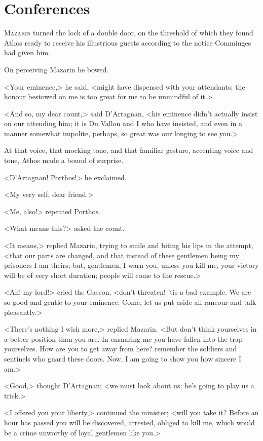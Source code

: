 \chapter{Conferences}

 \lettrine{M}{azarin} turned the lock of a double door, on the threshold of which they found Athos ready to receive his illustrious guests according to the notice Comminges had given him.

\zz
On perceiving Mazarin he bowed.

<Your eminence,> he said, <might have dispensed with your attendants; the honour bestowed on me is too great for me to be unmindful of it.>

<And so, my dear count,> said D'Artagnan, <his eminence didn't actually insist on our attending him; it is Du Vallon and I who have insisted, and even in a manner somewhat impolite, perhaps, so great was our longing to see you.>

At that voice, that mocking tone, and that familiar gesture, accenting voice and tone, Athos made a bound of surprise.

<D'Artagnan! Porthos!> he exclaimed.

<My very self, dear friend.>

<Me, also!> repeated Porthos.

<What means this?> asked the count.

<It means,> replied Mazarin, trying to smile and biting his lips in the attempt, <that our parts are changed, and that instead of these gentlemen being my prisoners I am theirs; but, gentlemen, I warn you, unless you kill me, your victory will be of very short duration; people will come to the rescue.>

<Ah! my lord!> cried the Gascon, <don't threaten! 'tis a bad example. We are so good and gentle to your eminence. Come, let us put aside all rancour and talk pleasantly.>

<There's nothing I wish more,> replied Mazarin. <But don't think yourselves in a better position than you are. In ensnaring me you have fallen into the trap yourselves. How are you to get away from here? remember the soldiers and sentinels who guard these doors. Now, I am going to show you how sincere I am.>

<Good,> thought D'Artagnan; <we must look about us; he's going to play us a trick.>

<I offered you your liberty,> continued the minister; <will you take it? Before an hour has passed you will be discovered, arrested, obliged to kill me, which would be a crime unworthy of loyal gentlemen like you.>

